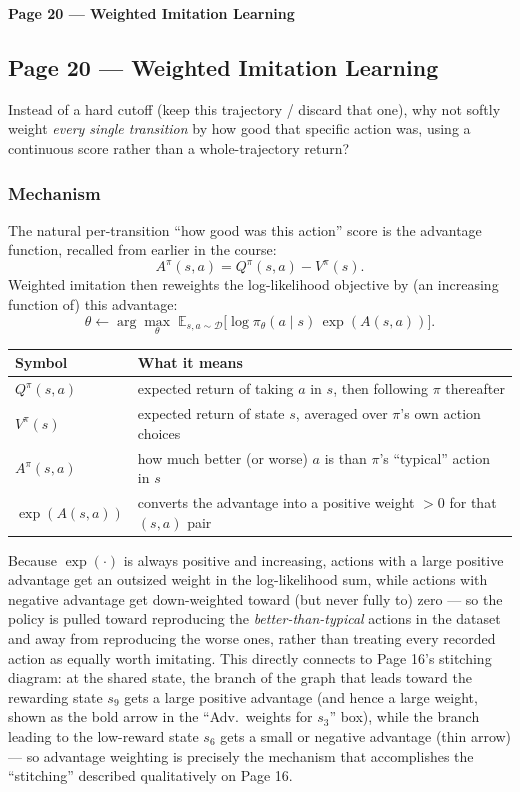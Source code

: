 \bigskip

\textbf{Page 20 --- Weighted Imitation Learning}

\subsection*{Page 20 --- Weighted Imitation Learning}

Instead of a hard cutoff (keep this trajectory / discard that one), why not softly weight \emph{every single transition} by how good that specific action was, using a continuous score rather than a whole-trajectory return?

\subsubsection*{Mechanism}

The natural per-transition ``how good was this action'' score is the advantage function, recalled from earlier in the course:
\[
A^\pi(s,a) = Q^\pi(s,a) - V^\pi(s).
\]
Weighted imitation then reweights the log-likelihood objective by (an increasing function of) this advantage:
\[
\theta \leftarrow \arg\max_\theta\; \mathbb{E}_{s,a\sim\mathcal{D}}\big[\log \pi_\theta(a\mid s)\, \exp(A(s,a))\big].
\]

\begin{center}
\begin{tabular}{@{}ll@{}}
\toprule
Symbol & What it means \\
\midrule
$Q^\pi(s,a)$ & expected return of taking $a$ in $s$, then following $\pi$ thereafter \\
$V^\pi(s)$ & expected return of state $s$, averaged over $\pi$'s own action choices \\
$A^\pi(s,a)$ & how much better (or worse) $a$ is than $\pi$'s ``typical'' action in $s$ \\
$\exp(A(s,a))$ & converts the advantage into a positive weight $> 0$ for that $(s,a)$ pair \\
\bottomrule
\end{tabular}
\end{center}

Because $\exp(\cdot)$ is always positive and increasing, actions with a large positive advantage get an outsized weight in the log-likelihood sum, while actions with negative advantage get down-weighted toward (but never fully to) zero --- so the policy is pulled toward reproducing the \emph{better-than-typical} actions in the dataset and away from reproducing the worse ones, rather than treating every recorded action as equally worth imitating. This directly connects to Page 16's stitching diagram: at the shared state, the branch of the graph that leads toward the rewarding state $s_9$ gets a large positive advantage (and hence a large weight, shown as the bold arrow in the ``Adv.\ weights for $s_3$'' box), while the branch leading to the low-reward state $s_6$ gets a small or negative advantage (thin arrow) --- so advantage weighting is precisely the mechanism that accomplishes the ``stitching'' described qualitatively on Page 16.
